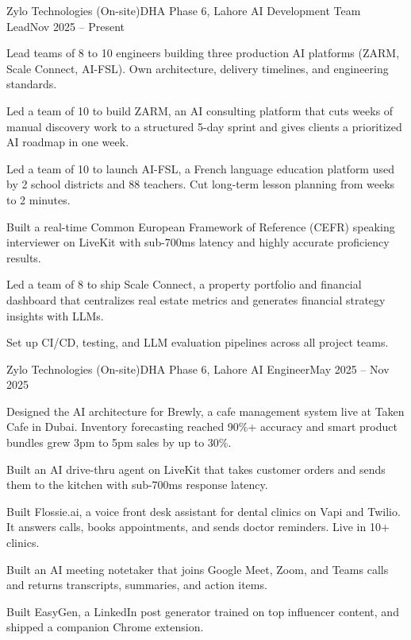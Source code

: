 \resumeSubheading
  {Zylo Technologies (On-site)}{DHA Phase 6, Lahore}
  {AI Development Team Lead}{Nov 2025 -- Present}
  \resumeItemListStart
    \item \small{Lead teams of 8 to 10 engineers building three production AI platforms (ZARM, Scale Connect, AI-FSL). Own architecture, delivery timelines, and engineering standards.}
    \item \small{Led a team of 10 to build ZARM, an AI consulting platform that cuts weeks of manual discovery work to a structured 5-day sprint and gives clients a prioritized AI roadmap in one week.}
    \item \small{Led a team of 10 to launch AI-FSL, a French language education platform used by 2 school districts and 88 teachers. Cut long-term lesson planning from weeks to 2 minutes.}
    \item \small{Built a real-time Common European Framework of Reference (CEFR) speaking interviewer on LiveKit with sub-700ms latency and highly accurate proficiency results.}
    \item \small{Led a team of 8 to ship Scale Connect, a property portfolio and financial dashboard that centralizes real estate metrics and generates financial strategy insights with LLMs.}
    \item \small{Set up CI/CD, testing, and LLM evaluation pipelines across all project teams.}
  \resumeItemListEnd

\resumeSubheading
  {Zylo Technologies (On-site)}{DHA Phase 6, Lahore}
  {AI Engineer}{May 2025 -- Nov 2025}
  \resumeItemListStart
    \item \small{Designed the AI architecture for Brewly, a cafe management system live at Taken Cafe in Dubai. Inventory forecasting reached 90\%+ accuracy and smart product bundles grew 3pm to 5pm sales by up to 30\%.}
    \item \small{Built an AI drive-thru agent on LiveKit that takes customer orders and sends them to the kitchen with sub-700ms response latency.}
    \item \small{Built Flossie.ai, a voice front desk assistant for dental clinics on Vapi and Twilio. It answers calls, books appointments, and sends doctor reminders. Live in 10+ clinics.}
    \item \small{Built an AI meeting notetaker that joins Google Meet, Zoom, and Teams calls and returns transcripts, summaries, and action items.}
    \item \small{Built EasyGen, a LinkedIn post generator trained on top influencer content, and shipped a companion Chrome extension.}
  \resumeItemListEnd

